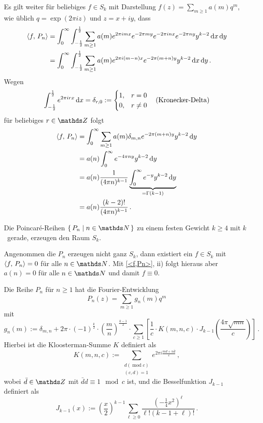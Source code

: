 \begin{bewe-list}
Es gilt weiter für beliebiges $f \in S_k$ mit Darstellung $f(z) = \sum_{m \geq 1} a(m)q^m$, wie üblich $q = \exp(2\pi iz)$ und $z = x + iy$, dass
\begin{align*}
	\scalarprd {f}{P_n} &= \int_0^\infty \int_{-\frac 12}^{\frac 12} \sum_{m \geq 1} a(m) e^{2 \pi imx}e^{-2\pi my}e^{-2\pi inx}e^{-2\pi ny}y^{k-2} \opd x \opd y\\
	&= \int_0^\infty \int_{-\frac 12}^{\frac 12} \sum_{m \geq 1} a(m) e^{2 \pi i(m-n)x}e^{-2\pi (m+n)y}y^{k-2} \opd x \opd y\,.
\end{align*}
Wegen 
\[
	\int_{- \frac 12}^{\frac 12} e^{2 \pi irx} \,\mathrm{d} x = \delta_{r,0} := \begin{cases}1, & r = 0\\0, & r \neq 0\end{cases} \quad \text{(Kronecker-Delta)}
\]
für beliebiges $r \in \ZZ$ folgt
\begin{align*}
	\scalarprd {f}{P_n} &= \int_0^\infty \sum_{m \geq 1} a(m) \delta_{m,n} e^{-2\pi (m+n)y}y^{k-2} \opd y \\
	&= a(n) \int_0^\infty e^{-4\pi ny} y^{k-2} \opd y \\
	&= a(n) \frac{1}{(4\pi n)^{k-1}} \underbrace{\int_0^\infty e^{-y} y^{k-2} \opd y}_{= \Gamma(k-1)} \\
	&= a(n) \frac{(k-2)!}{(4\pi n)^{k-1}}
	\,.
\end{align*}
\end{bewe-list}

\begin{koro}
Die Poincaré-Reihen $\Set{ P_n \mid n \in \NN}$ zu einem festen Gewicht $k \geq 4$ mit $k$~gerade, erzeugen den Raum $S_k$.
\end{koro}

\begin{bewe}
Angenommen die $P_n$ erzeugen nicht ganz $S_k$, dann existiert ein $f \in S_k$ mit $\scalarprd {f}{P_n} = 0$ für alle $n \in \NN$. Mit \autoref{<f,Pn>}, ii) folgt hieraus aber $a(n) = 0$ für alle $n \in \NN$ und damit $f \equiv 0$.
\end{bewe}

\begin{satz}\label{satz:Pn_Fourier}
Die Reihe $P_n$ für $n \geq 1$ hat die Fourier-Entwicklung
\[
	P_n(z) = \sum_{m \geq 1} g_n(m) q^m
\]
mit
\[
	g_n(m) := \delta_{m,n} + 2\pi \cdot (-1)^{\frac k2} \cdot \left(\frac mn\right)^{\frac {k-1}2} \cdot \sum_{c \geq 1} \left[ \frac 1c \cdot K(m,n,c) \cdot J_{k-1}\left(\frac{4\pi \sqrt{mn}}c\right) \right]
	\,.
\]
Hierbei ist die Kloosterman-Summe $K$ definiert als
\[
	K(m,n,c) := \sum_{\substack{d (\operatorname{mod} c) \\ (c,d)=1}} e^{2\pi i \frac{md + n\bar{d}}{c}}
	\,,
\]
wobei $\bar d \in \ZZ$ mit $\bar d d \equiv 1 \mod c$ ist, und die Besselfunktion $J_{k-1}$ definiert als
\[
	J_{k-1}(x) := \left(\frac x2\right)^{k-1} \sum_{\ell \geq 0} \frac{(-\frac 14 x^2)^\ell}{\ell! (k-1+\ell)!}
	\,.
\]
\end{satz}

